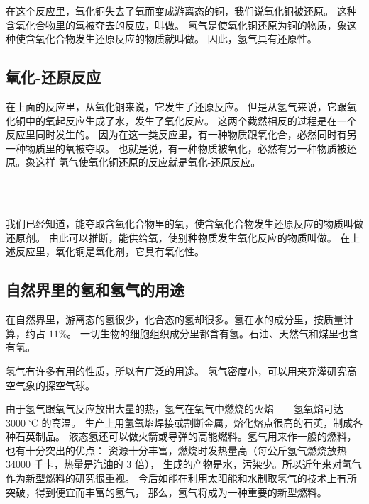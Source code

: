 在这个反应里，氧化铜失去了氧而变成游离态的铜，我们说氧化铜被还原。
这种含氧化合物里的氧被夺去的反应，叫做。
氢气是使氧化铜还原为铜的物质，象这种使含氧化合物发生还原反应的物质就叫做。
因此，氢气具有还原性。


\subsection{氧化-还原反应}

在上面的反应里，从氧化铜来说，它发生了还原反应。
但是从氢气来说，它跟氧化铜中的氧起反应生成了水，发生了氧化反应。
这两个截然相反的过程是在一个反应里同时发生的。
因为在这一类反应里，有一种物质跟氧化合，必然同时有另一种物质里的氧被夺取。
也就是说，有一种物质被氧化，必然有另一种物质被还原。象这样%
氢气使氧化铜还原的反应就是氧化-还原反应。
\begin{fangchengshi}
    \phantom{a} \\[1em]
    \\[1em]
\end{fangchengshi}

我们已经知道，能夺取含氧化合物里的氧，使含氧化合物发生还原反应的物质叫做还原剂。
由此可以推断，能供给氧，使别种物质发生氧化反应的物质叫做。
在上述反应里，氧化铜是氧化剂，它具有氧化性。



\subsection{自然界里的氢和氢气的用途}

在自然界里，游离态的氢很少，化合态的氢却很多。氢在水的成分里，按质量计算，约占 $11\%$。
一切生物的细胞组织成分里都含有氢。石油、天然气和煤里也含有氢。

氢气有许多有用的性质，所以有广泛的用途。
氢气密度小，可以用来充灌研究高空气象的探空气球。

由于氢气跟氧气反应放出大量的热，氢气在氧气中燃烧的火焰——氢氧焰可达 $3000$ ℃ 的高温。
生产上用氢氧焰焊接或割断金属，熔化熔点很高的石英，制成各种石英制品。
液态氢还可以做火箭或导弹的高能燃料。氢气用来作一般的燃料，也有十分突出的优点：
资源十分丰富，燃烧时发热量高（每公斤氢气燃烧放热 $34000$ 千卡，热量是汽油的 $3$ 倍），
生成的产物是水，污染少。所以近年来对氢气作为新型燃料的研究很重视。
今后如能在利用太阳能和水制取氢气的技术上有所突破，得到便宜而丰富的氢气，
那么，氢气将成为一种重要的新型燃料。

